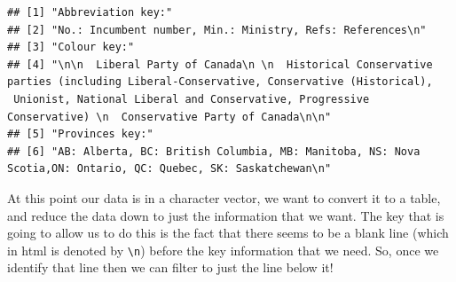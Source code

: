 \documentclass[
]{book}
\newenvironment{Shaded}{\begin{snugshade}}{\end{snugshade}}
\newcommand{\CharTok}[1]{\textcolor[rgb]{0.31,0.60,0.02}{#1}}
\newcommand{\CommentTok}[1]{\textcolor[rgb]{0.56,0.35,0.01}{\textit{#1}}}
\newcommand{\DataTypeTok}[1]{\textcolor[rgb]{0.13,0.29,0.53}{#1}}
\newcommand{\DecValTok}[1]{\textcolor[rgb]{0.00,0.00,0.81}{#1}}
\newcommand{\KeywordTok}[1]{\textcolor[rgb]{0.13,0.29,0.53}{\textbf{#1}}}
\newcommand{\NormalTok}[1]{#1}
\newcommand{\OperatorTok}[1]{\textcolor[rgb]{0.81,0.36,0.00}{\textbf{#1}}}
\newcommand{\StringTok}[1]{\textcolor[rgb]{0.31,0.60,0.02}{#1}}
\begin{document}
\begin{verbatim}
## [1] "Abbreviation key:"                                                                                                                                                                                                                              
## [2] "No.: Incumbent number, Min.: Ministry, Refs: References\n"                                                                                                                                                                                      
## [3] "Colour key:"                                                                                                                                                                                                                                    
## [4] "\n\n  Liberal Party of Canada\n \n  Historical Conservative parties (including Liberal-Conservative, Conservative (Historical),     Unionist, National Liberal and Conservative, Progressive Conservative) \n  Conservative Party of Canada\n\n"
## [5] "Provinces key:"                                                                                                                                                                                                                                 
## [6] "AB: Alberta, BC: British Columbia, MB: Manitoba, NS: Nova Scotia,ON: Ontario, QC: Quebec, SK: Saskatchewan\n"
\end{verbatim}

At this point our data is in a character vector, we want to convert it to a table, and reduce the data down to just the information that we want. The key that is going to allow us to do this is the fact that there seems to be a blank line (which in html is denoted by \texttt{\textbackslash{}n}) before the key information that we need. So, once we identify that line then we can filter to just the line below it!

\begin{Shaded}
\end{Shaded}
\end{document}
